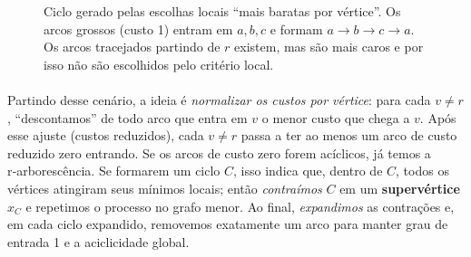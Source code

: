 \documentclass[12pt,a4paper]{article}
\begin{document}
\begin{figure}[htbp]
    \centering
    \caption{Ciclo gerado pelas escolhas locais “mais baratas por vértice”. Os arcos grossos (custo 1) entram em \(a,b,c\) e formam \(a\to b\to c\to a\). Os arcos tracejados partindo de \(r\) existem, mas são mais caros e por isso não são escolhidos pelo critério local.}
    \label{fig:chu-liu-cycle-micro}
\end{figure}

\paragraph{}
Partindo desse cenário, a ideia é \emph{normalizar os custos por vértice}: para cada \(v\neq r\), “descontamos” de todo arco que entra em \(v\) o menor custo que chega a \(v\). Após esse ajuste (custos reduzidos), cada \(v\neq r\) passa a ter ao menos um arco de custo reduzido zero entrando. Se os arcos de custo zero forem acíclicos, já temos a r‑arborescência. Se formarem um ciclo \(C\), isso indica que, dentro de \(C\), todos os vértices atingiram seus mínimos locais; então \emph{contraímos} \(C\) em um \textbf{supervértice} \(x_C\) e repetimos o processo no grafo menor. Ao final, \emph{expandimos} as contrações e, em cada ciclo expandido, removemos exatamente um arco para manter grau de entrada 1 e a aciclicidade global.
\end{document}
